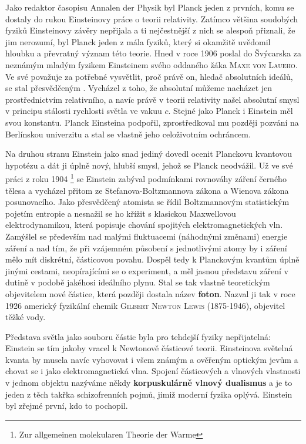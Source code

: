         Jako redaktor časopisu Annalen der Physik byl Planck jeden z prvních, komu se dostaly do
        rukou Einsteinovy práce o teorii relativity. Zatímco většina soudobých fyziků Einsteinovy
        závěry nepřijala a ti nejčestnější z nich se alespoň přiznali, že jim nerozumí, byl Planck
        jeden z mála fyziků, který si okamžitě uvědomil hloubku a převratný význam této teorie. Hned
        v roce 1906 poslal do Švýcarska za neznámým mladým fyzikem Einsteinem svého oddaného žáka
        \textsc{Maxe von Laueho}. Ve své  považuje za potřebné vysvětlit,
        proč právě on, hledač absolutních ideálů, se stal přesvědčeným . Vycházel z
        toho, že absolutní můžeme nacházet jen prostřednictvím relativního, a navíc právě v teorii
        relativity našel absolutní smysl v principu stálosti rychlosti světla ve vakuu \(c\). Stejné
        jako Planck i Einstein měl svou konstantu. Planck Einsteina podpořil, zprostředkoval mu
        později pozvání na Berlínskou univerzitu a stal se vlastně jeho celoživotním ochráncem.

        Na druhou stranu Einstein jako snad jediný dovedl ocenit Planckovu kvantovou hypotézu a dát
        ji úplně nový, hlubší smysl, jehož se Planck neodvážil. Už ve své práci z roku 1904
        \emph{}\footnote{Zur allgemeinen molekularen Theorie
        der Warme} se Einstein zabýval podmínkami rovnováhy záření černého tělesa a vycházel přitom
        ze Stefanova-Boltzmannova zákona a Wienova zákona posunovacího. Jako přesvědčený atomista se
        řídil Boltzmannovým statistickým pojetím entropie a nesnažil se ho křížit s klasickou
        Maxwellovou elektrodynamikou, která popisuje chování spojitých elektromagnetických vln.
        Zamýšlel se především nad malými fluktuacemi (náhodnými změnami) energie záření a nad tím,
        že při vzájemném působení s jednotlivými atomy by i záření mělo mít diskrétní, částicovou
        povahu. Dospěl tedy k Planckovým kvantům úplně jinými cestami, neopírajícími se o
        experiment, a měl jasnou představu záření v dutině v podobě jakéhosi ideálního plynu. Stal
        se tak vlastně teoretickým objevitelem nové částice, která později dostala název
        \textbf{foton}. Nazval ji tak v roce 1926 americký fyzikální chemik \textsc{Gilbert Newton
        Lewis} (1875-1946), objevitel těžké vody. 

        Představa světla jako souboru částic byla pro tehdejší fyziky nepřijatelná: Einstein se tím
        jakoby vracel k Newtonově částicové teorii. Einsteinova světelná kvanta by musela navíc
        vyhovovat i všem známým a ověřeným optickým jevům a chovat se i jako elektromagnetická vlna.
        Spojení částicových a vlnových vlastnosti v jednom objektu nazýváme někdy
        \textbf{korpuskulárně vlnový dualismus} a je to jeden z těch takřka schizofrenních pojmů,
        jimiž moderní fyzika oplývá. Einstein byl zřejmé první, kdo to pochopil.

